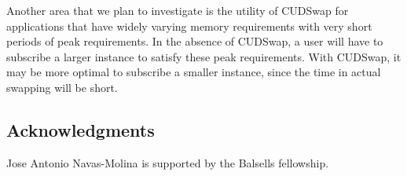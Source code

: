 Another area that we plan to investigate is the utility of CUDSwap
for applications that have widely varying memory requirements with
very short periods of peak requirements. In the absence of CUDSwap, a user
will have to subscribe a larger instance to satisfy these peak requirements.
With CUDSwap, it may be more optimal to subscribe a smaller instance, since
the time in actual swapping will be short.

\subsection{Acknowledgments}

Jose Antonio Navas-Molina is supported by the Balsells fellowship.
